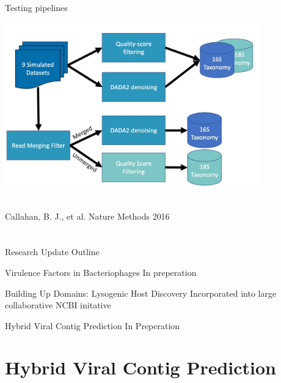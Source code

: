 \documentclass[11pt, xcolor=table]{beamer}
\begin{document}
	\begin{frame}{Testing pipelines}
	\vspace{-0.5cm}
	\center
	\includegraphics[height=8cm, width=11cm]{CPBS_11_18/duo_pipe.jpg}
	\begin{flushright}
	\tiny{Callahan, B. J., et al. Nature Methods 2016}
	\end{flushright}
	\end{frame}

	
\section{}
\subsection{}
	\begin{frame}{Research Update Outline}
	\begin{block}{\textcolor{black!50}{Virulence Factors in Bacteriophages}}
	\textcolor{black!50}{In preperation}
	\end{block}
	
	\begin{block}{Building Up Domains: Lysogenic Host Discovery}
	Incorporated into large collaborative NCBI initative
	\end{block}

	\begin{block}{\textcolor{black!50}{Hybrid Viral Contig Prediction}}
	\textcolor{black!50}{In Preperation}
	\end{block}
	\end{frame}

	
\section{Hybrid Viral Contig Prediction}
\end{document}
